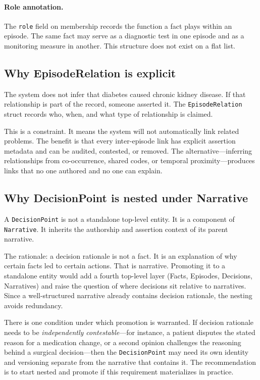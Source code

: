 \documentclass[11pt]{article}
\begin{document}
\paragraph{Role annotation.}
The \texttt{role} field on membership records the function a fact plays
within an episode. The same fact may serve as a diagnostic test in one
episode and as a monitoring measure in another. This structure does not exist
on a flat list.


\subsection{Why EpisodeRelation is explicit}
\label{sec:relation-rationale}

The system does not infer that diabetes caused chronic kidney disease. If
that relationship is part of the record, someone asserted it. The
\texttt{EpisodeRelation} struct records who, when, and what type of
relationship is claimed.

This is a constraint. It means the system will not automatically link
related problems. The benefit is that every inter-episode link has explicit
assertion metadata
and can be audited, contested, or removed. The alternative---inferring
relationships from co-occurrence, shared codes, or temporal
proximity---produces links that no one authored and no one can explain.

\subsection{Why DecisionPoint is nested under Narrative}
\label{sec:decision-point-rationale}

A \texttt{DecisionPoint} is not a standalone top-level entity. It is a
component of \texttt{Narrative}. It inherits the authorship and assertion context
of its parent narrative.

The rationale: a decision rationale is not a fact. It is an explanation of
why certain facts led to certain actions. That is narrative. Promoting it to
a standalone entity would add a fourth top-level layer (Facts, Episodes,
Decisions, Narratives) and raise the question of where decisions sit relative
to narratives. Since a well-structured narrative already contains decision
rationale, the nesting avoids redundancy.

There is one condition under which promotion is warranted. If decision
rationale needs to be \emph{independently contestable}---for instance, a
patient disputes the stated reason for a medication change, or a second
opinion challenges the reasoning behind a surgical decision---then the
\texttt{DecisionPoint} may need its own identity and versioning separate
from the narrative that contains it. The recommendation is to start nested
and promote if this requirement materializes in practice.
\end{document}
